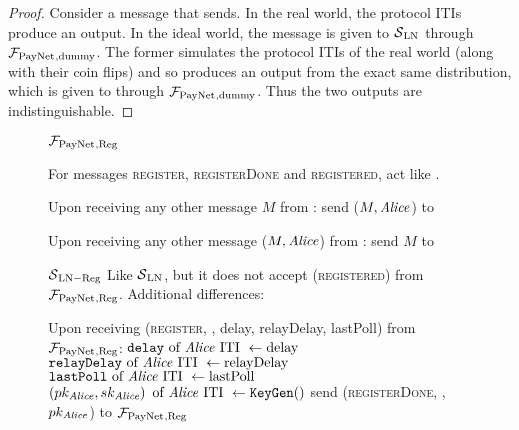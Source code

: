   \begin{proof}
    Consider a message that \environment{} sends. In the real world, the
    protocol ITIs produce an output. In the ideal world, the message is given to
    $\mathcal{S}{}_{\mathrm{LN}}$ through $\mathcal{F}_{\mathrm{PayNet}}{}_{\mathrm{, dummy}}$. The
    former simulates the protocol ITIs of the real world (along with their coin
    flips) and so produces an output from the exact same distribution, which is
    given to \environment{} through $\mathcal{F}_{\mathrm{PayNet}}{}_{\mathrm{, dummy}}$. Thus the
    two outputs are indistinguishable.
  \end{proof}

  \begin{figure}[H]
    \begin{systembox}{$\mathcal{F}_{\mathrm{PayNet}}{}_{\mathrm{, Reg}}$}
      \begin{algorithmic}[1]
        \State For messages \textsc{register}, \textsc{registerDone} and
        \textsc{registered}, act like \fpaynet{}.
        \Statex

        \State Upon receiving any other message $M$ from \alice:
        \Indent
            \State send ($M, \mathit{Alice}$) to \simulator
          \EndIf
        \EndIndent
        \Statex

        \State Upon receiving any other message ($M, \mathit{Alice}$) from \simulator:
        \Indent
            \State send $M$ to \alice
          \EndIf
        \EndIndent
      \end{algorithmic}
    \end{systembox}
    \caption{}
    \label{alg:fpaynet:reg}
  \end{figure}

  \begin{figure}[H]
    \begin{simulatorbox}{$\mathcal{S}{}_{\mathrm{LN - Reg}}$}
      Like $\mathcal{S}{}_{\mathrm{LN}}$, but it does not accept
      (\textsc{registered}) from $\mathcal{F}_{\mathrm{PayNet}}{}_{\mathrm{, Reg}}$.
      Additional differences:
      \begin{algorithmic}[1]
        \State Upon receiving (\textsc{register}, \alice, delay, relayDelay,
        lastPoll) from $\mathcal{F}_{\mathrm{PayNet}}{}_{\mathrm{, Reg}}$:
        \Indent
          \State $\mathtt{delay} \text{ of \ensuremath{\mathit{Alice}}{} ITI } \gets \mathrm{delay}$
          \label{alg:sim:reg:delay}
          \State $\mathtt{relayDelay} \text{ of \ensuremath{\mathit{Alice}}{} ITI } \gets
          \mathrm{relayDelay}$
          \State $\mathtt{lastPoll} \text{ of \ensuremath{\mathit{Alice}}{} ITI } \gets
          \mathrm{lastPoll}$
          \State $\left(pk_{\mathit{Alice}}, sk_{\mathit{Alice}}\right) \text{ of \ensuremath{\mathit{Alice}}{} ITI }
          \gets \mathtt{KeyGen}()$
          \label{alg:sim:reg:keygen}
          \State send (\textsc{registerDone}, \alice, $pk_{\mathit{Alice}}$) to
          $\mathcal{F}_{\mathrm{PayNet}}{}_{\mathrm{, Reg}}$
        \EndIndent
      \end{algorithmic}
    \end{simulatorbox}
    \caption{}
    \label{alg:sim:reg}
  \end{figure}

